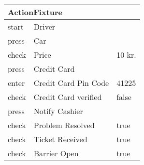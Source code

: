 \vspace{0.4cm}
\begin{tabular}{| p{2cm} | p{5.5cm} | p{5.5cm} |} \hline
\multicolumn{3}{|l|}{ActionFixture} \\ \hline
start & \multicolumn{2}{|l|}{Driver} \\ \hline
press & \multicolumn{2}{|l|}{Car} \\ \hline
check & Price & 10 kr. \\ \hline
press & \multicolumn{2}{|l|}{Credit Card} \\ \hline
enter & Credit Card Pin Code & 41225 \\ \hline
check & Credit Card verified & false \\ \hline
press & \multicolumn{2}{|l|}{Notify Cashier} \\ \hline
check & Problem Resolved & true \\ \hline
check & Ticket Received & true \\ \hline
check & Barrier Open & true \\ \hline
\end{tabular}
\vspace{0.8cm}
